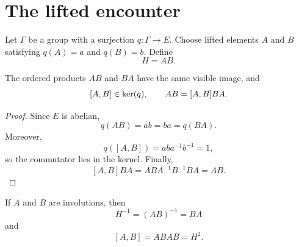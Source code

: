 \section{The lifted encounter}

Let \(\Gamma\) be a group with a surjection \(q:\Gamma\to E\). Choose
lifted elements \(A\) and \(B\) satisfying \(q(A)=a\) and \(q(B)=b\). Define
\[
H=AB.
\]

\begin{proposition}
The ordered products \(AB\) and \(BA\) have the same visible image, and
\[
[A,B]\in\operatorname{ker}(q),
\qquad
AB=[A,B]BA.
\]
\end{proposition}

\begin{proof}
Since \(E\) is abelian,
\[
q(AB)=ab=ba=q(BA).
\]
Moreover,
\[
q([A,B])=aba^{-1}b^{-1}=1,
\]
so the commutator lies in the kernel. Finally,
\[
[A,B]BA=ABA^{-1}B^{-1}BA=AB.
\]
\end{proof}

If \(A\) and \(B\) are involutions, then
\[
H^{-1}=(AB)^{-1}=BA
\]
and
\[
[A,B]=ABAB=H^2.
\]
